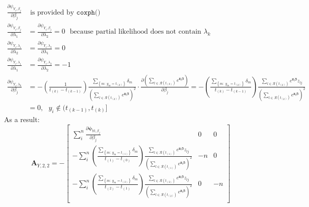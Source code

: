 \documentclass[]{article}
\begin{document}
$$
\begin{aligned}
  \frac{\partial \psi_{Y_i,\beta_j}}{ \partial \beta_j} &\text{~is provided by }\texttt{coxph()}\\
  \frac{\partial \psi_{Y_i,\beta_j}}{ \partial \lambda_1} &= \frac{\partial \psi_{Y_i,\beta_j}}{ \partial \lambda_2} = 0~~~\text{because partial likelihood does not contain } \lambda_k\\
  \frac{\partial \psi_{Y_i,\lambda_1}}{  \partial \lambda_2} &= \frac{\partial \psi_{Y_i,\lambda_2}}{  \partial \lambda_1} = 0\\
  \frac{\partial \psi_{Y_i,\lambda_1}}{  \partial \lambda_1} &= \frac{\partial \psi_{Y_i,\lambda_2}}{  \partial \lambda_2} = - 1\\
  \frac{\partial \psi_{Y_i,\lambda_k}}{  \partial \beta_j} &= - \left( \frac{1}{t_{(k)} - t_{(k-1)}}  \right)   \frac{\sum_{\left\{m:~y_m = t_{(k)}\right\}} \delta_m}{\left(\sum_{l\in \mathcal{R}(t_{(k)})} e^{\pmb{z}_l\pmb{\beta}}\right)^2}   \cdot \frac{ \partial \left(   \sum_{l\in \mathcal{R}(t_{(k)})} e^{\pmb{z}_l\pmb{\beta}}  \right)}{\partial  \beta_j} = -\left( \frac{\sum_{\left\{m:~y_m = t_{(k)}\right\}} \delta_m}{t_{(k)} - t_{(k-1)}}  \right)   \frac{     \sum_{l\in \mathcal{R}(t_{(k)})}  e^{\pmb{z}_l\pmb{\beta}} z_{lj}  }{\left(   \sum_{l\in \mathcal{R}(t_{(k)})} e^{\pmb{z}_l\pmb{\beta}}  \right)^2} \\
  & = 0, ~~~y_i \notin (t_{(k-1)}, t_{(k)}]
\end{aligned}
$$
As a result:
  \[
  \pmb{A}_{Y,2,2}
   =-\begin{bmatrix}
      \sum_i^n\frac{\partial \pmb{\psi}_{Yi,\beta_j}}{ \partial \beta_j} & 0 & 0 \\
      -\sum_i^n\left( \frac{\sum_{\left\{m:~y_m = t_{(1)}\right\}} \delta_m}{t_{(1)} - t_{(0)}}  \right)   \frac{     \sum_{l\in \mathcal{R}(t_{(1)})}  e^{\pmb{z}_l\pmb{\beta}} z_{lj}  }{\left(   \sum_{l\in \mathcal{R}(t_{(1)})} e^{\pmb{z}_l\pmb{\beta}}  \right)^2} & -n & 0 \\
      -\sum_i^n\left( \frac{\sum_{\left\{m:~y_m = t_{(2)}\right\}} \delta_m}{t_{(2)} - t_{(1)}}  \right)   \frac{     \sum_{l\in \mathcal{R}(t_{(2)})}  e^{\pmb{z}_l\pmb{\beta}} z_{lj}  }{\left(   \sum_{l\in \mathcal{R}(t_{(2)})} e^{\pmb{z}_l\pmb{\beta}}  \right)^2} & 0 & -n \\
  \end{bmatrix}
  \]
\end{document}
